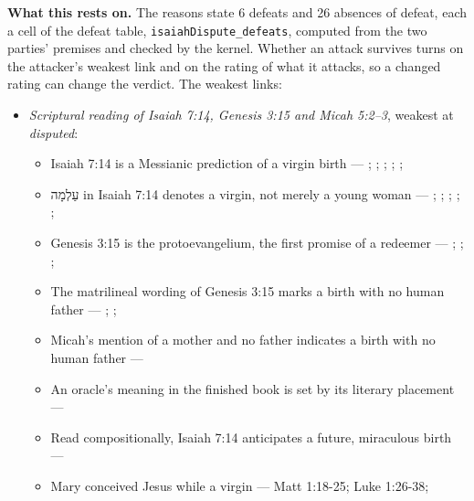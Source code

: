 \documentclass[11pt]{article}
\begin{document}
\par\noindent\textbf{What this rests on.} The reasons state 6 defeats and 26 absences of defeat, each a cell of the defeat table, \texttt{isaiah\allowbreak{}Dispute\_\allowbreak{}defeats}, computed from the two parties' premises and checked by the kernel. Whether an attack survives turns on the attacker's weakest link and on the rating of what it attacks, so a changed rating can change the verdict. The weakest links:
\begin{itemize}
\item \emph{Scriptural reading of Isaiah 7:14, Genesis 3:15 and Micah 5:2–3}, weakest at \emph{disputed}:
\begin{itemize}
\item Isaiah 7:14 is a Messianic prediction of a virgin birth --- \cite[ad loc. Isa 7:14]{motyer-isaiah-1993}; \cite[123]{motyer-context-content-1970}; \cite[12--14]{compton-immanuel-prophecy-2007}; \cite[66]{justin-dialogue-with-trypho-160}; \cite[III.21.6]{irenaeus-against-heresies-180}; \cite[I.35]{origen-against-celsus-248}
\item עַלְמָה in Isaiah 7:14 denotes a virgin, not merely a young woman --- \cite[ad loc. Isa 7:14]{motyer-isaiah-1993}; \cite[app. Isa 7:14]{bhs-1997}; \cite[1653--1654]{berry-virgin-birth-2003}; \cite[125]{motyer-context-content-1970}; \cite[7--8]{compton-immanuel-prophecy-2007}; \cite[I.32]{jerome-against-jovinianus-393}
\item Genesis 3:15 is the protoevangelium, the first promise of a redeemer --- \cite[167]{leupold-exposition-genesis-1942}; \cite[102]{keil-delitzsch-pentateuch-1866}; \cite{miravalle-meet-your-mother-2014}; \cite[318]{lewis-womans-seed-1991}
\item The matrilineal wording of Genesis 3:15 marks a birth with no human father --- \cite[298--299]{luther-on-the-creation-1904}; \cite{miravalle-meet-your-mother-2014}; \cite[ad loc. Gen 3:15]{henry-commentary-whole-bible}
\item Micah’s mention of a mother and no father indicates a birth with no human father --- \cite{miravalle-introduction-mary-2020}
\item An oracle’s meaning in the finished book is set by its literary placement --- \cite[476--479]{postell-isaiah-messianic-2025}
\item Read compositionally, Isaiah 7:14 anticipates a future, miraculous birth --- \cite[490--493]{postell-isaiah-messianic-2025}
\item Mary conceived Jesus while a virgin --- Matt 1:18-25; Luke 1:26-38; \cite[30--33]{brown-problem-virginal-conception-1972}

\end{itemize}
\end{itemize}
\end{document}
